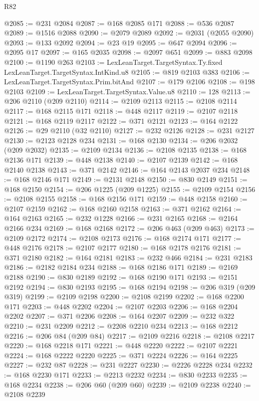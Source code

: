 \begin{lexlean}{R82}
\begin{coremodule}
@2085 := @231 @2084
@2087 := @168 @2085 @171
@2088 := @536 @2087
@2089 := @1516 @2088
@2090 := @2079 @2089
@2092 := @2031 (@2055 @2090)
@2093 := @133 @2092
@2094 := @23 @19
@2095 := @647 @2094
@2096 := @2095 @17
@2097 := @165 @2035
@2098 := @2097 @651
@2099 := @883 @2098
@2100 := @1190 @263
@2103 := LexLeanTarget.TargetSyntax.Ty.fixed LexLeanTarget.TargetSyntax.IntKind.u8
@2105 := @819 @2103 @383
@2106 := LexLeanTarget.TargetSyntax.Prim.bitAnd
@2107 := @179 @2106
@2108 := @198 @2103
@2109 := LexLeanTarget.TargetSyntax.Value.u8
@2110 := 128
@2113 := @206 @2110 (@209 @2110)
@2114 := @2109 @2113
@2115 := @2108 @2114
@2117 := @168 @2115 @171
@2118 := @448 @2117
@2119 := @2107 @2118
@2121 := @168 @2119 @2117
@2122 := @371 @2121
@2123 := @164 @2122
@2126 := @29 @2110 (@32 @2110)
@2127 := @232 @2126
@2128 := @231 @2127
@2130 := @2123 @2128 @234
@2131 := @168 @2130
@2134 := @206 @2032 (@209 @2032)
@2135 := @2109 @2134
@2136 := @2108 @2135
@2138 := @168 @2136 @171
@2139 := @448 @2138
@2140 := @2107 @2139
@2142 := @168 @2140 @2138
@2143 := @371 @2142
@2146 := @164 @2143 @2037 @234
@2148 := @168 @2146 @171
@2149 := @2131 @2148
@2150 := @830 @2149
@2151 := @168 @2150
@2154 := @206 @1225 (@209 @1225)
@2155 := @2109 @2154
@2156 := @2108 @2155
@2158 := @168 @2156 @171
@2159 := @448 @2158
@2160 := @2107 @2159
@2162 := @168 @2160 @2158
@2163 := @371 @2162
@2164 := @164 @2163
@2165 := @232 @1228
@2166 := @231 @2165
@2168 := @2164 @2166 @234
@2169 := @168 @2168
@2172 := @206 @463 (@209 @463)
@2173 := @2109 @2172
@2174 := @2108 @2173
@2176 := @168 @2174 @171
@2177 := @448 @2176
@2178 := @2107 @2177
@2180 := @168 @2178 @2176
@2181 := @371 @2180
@2182 := @164 @2181
@2183 := @232 @466
@2184 := @231 @2183
@2186 := @2182 @2184 @234
@2188 := @168 @2186 @171
@2189 := @2169 @2188
@2190 := @830 @2189
@2192 := @168 @2190 @171
@2193 := @2151 @2192
@2194 := @830 @2193
@2195 := @168 @2194
@2198 := @206 @319 (@209 @319)
@2199 := @2109 @2198
@2200 := @2108 @2199
@2202 := @168 @2200 @171
@2203 := @448 @2202
@2204 := @2107 @2203
@2206 := @168 @2204 @2202
@2207 := @371 @2206
@2208 := @164 @2207
@2209 := @232 @322
@2210 := @231 @2209
@2212 := @2208 @2210 @234
@2213 := @168 @2212
@2216 := @206 @84 (@209 @84)
@2217 := @2109 @2216
@2218 := @2108 @2217
@2220 := @168 @2218 @171
@2221 := @448 @2220
@2222 := @2107 @2221
@2224 := @168 @2222 @2220
@2225 := @371 @2224
@2226 := @164 @2225
@2227 := @232 @87
@2228 := @231 @2227
@2230 := @2226 @2228 @234
@2232 := @168 @2230 @171
@2233 := @2213 @2232
@2234 := @830 @2233
@2235 := @168 @2234
@2238 := @206 @60 (@209 @60)
@2239 := @2109 @2238
@2240 := @2108 @2239

\end{coremodule}
\end{lexlean}
